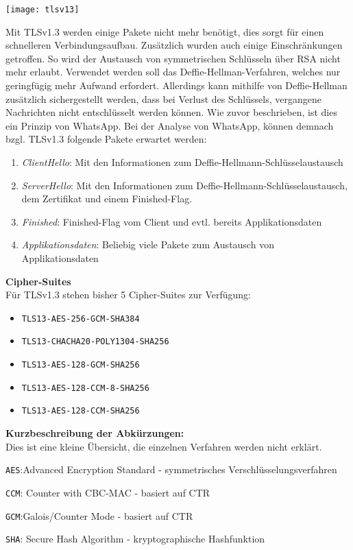 \begin{center}
    \texttt{[image: tlsv13]}
\end{center}
Mit TLSv1.3 werden einige Pakete nicht mehr benötigt, dies sorgt für einen 
schnelleren Verbindungsaufbau. Zusätzlich wurden auch einige Einschränkungen
getroffen. So wird der Austausch von symmetrischen Schlüsseln über RSA
nicht mehr erlaubt. Verwendet werden soll das Deffie-Hellman-Verfahren, welches
nur geringfügig mehr Aufwand erfordert. Allerdings kann mithilfe von Deffie-Hellman zusätzlich 
sichergestellt werden, dass bei Verlust des Schlüssels, vergangene Nachrichten
nicht entschlüsselt werden können. Wie zuvor beschrieben, ist dies 
ein Prinzip von WhatsApp.
Bei der Analyse von WhatsApp, können demnach bzgl. TLSv1.3 folgende Pakete erwartet werden: 
\begin{enumerate}
    \item \textit{ClientHello}: Mit den Informationen zum Deffie-Hellmann-Schlüsselaustausch
    \item \textit{ServerHello}: Mit den Informationen zum Deffie-Hellmann-Schlüsselaustausch, dem Zertifikat und einem Finished-Flag.
    \item \textit{Finished}: Finished-Flag vom Client und evtl. bereits Applikationsdaten
    \item \textit{Applikationsdaten}: Beliebig viele Pakete zum Austausch von Applikationsdaten
\end{enumerate}
\textbf{Cipher-Suites}\\
\cite{tls2} Für TLSv1.3 stehen bisher 5 Cipher-Suites zur Verfügung: 
\begin{itemize}
    \item \texttt{TLS13-AES-256-GCM-SHA384}
    \item \texttt{TLS13-CHACHA20-POLY1304-SHA256}
    \item \texttt{TLS13-AES-128-GCM-SHA256}
    \item \texttt{TLS13-AES-128-CCM-8-SHA256}
    \item \texttt{TLS13-AES-128-CCM-SHA256}
\end{itemize}
\textbf{Kurzbeschreibung der Abkürzungen:}\\
Dies ist eine kleine Übersicht, die einzelnen Verfahren werden nicht erklärt.
\begin{description}
    \item \texttt{AES}:Advanced Encryption Standard - symmetrisches Verschlüsselungsverfahren
    \item \texttt{CCM}: Counter with CBC-MAC - basiert auf CTR
    \item \texttt{GCM}:Galois/Counter Mode - basiert auf CTR
    \item \texttt{SHA}: Secure Hash Algorithm - kryptographische Hashfunktion
\end{description}







 
